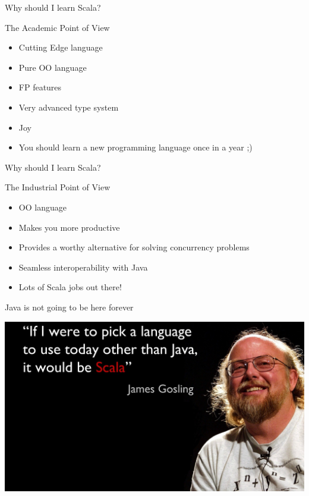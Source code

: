 
\begin{frame}{Why should I learn Scala?}
\begin{block}{The Academic Point of View}
\begin{itemize}
  \item Cutting Edge language
  \item Pure OO language
  \item FP features
  \item Very advanced type system
  \item Joy
  \item You should learn a new programming language once in a year ;)
\end{itemize}
\end{block}
\end{frame}

\begin{frame}{Why should I learn Scala?}
\begin{block}{The Industrial Point of View}
\begin{itemize}
  \item OO language
  \item Makes you more productive
  \item Provides a worthy alternative for solving concurrency problems
  \item Seamless interoperability with Java
  \item Lots of Scala jobs out there!
\end{itemize}
\end{block}
\end{frame}


\begin{frame}{Java is not going to be here forever}
\begin{center}
\includegraphics[scale=0.3]{resources/JamesGoslingScala.jpg}
\end{center}
\end{frame}

